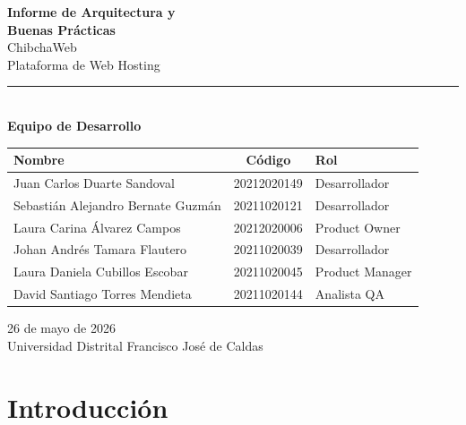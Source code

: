 \documentclass[12pt, a4paper]{article}
\begin{document}
\begin{titlepage}
    \centering
    \vspace*{2cm}

    {\Huge\bfseries\textcolor{chibchablue}{Informe de Arquitectura y\\[0.3em] Buenas Prácticas}}\\[1.5em]
    {\LARGE\textcolor{chibchagreen}{ChibchaWeb}}\\[0.5em]
    {\large Plataforma de Web Hosting}\\[3em]

    \rule{\textwidth}{1pt}\\[2em]

    {\large\textbf{Equipo de Desarrollo}}\\[1.5em]

    \begin{tabular}{l c l}
        \toprule
        \textbf{Nombre} & \textbf{Código} & \textbf{Rol} \\
        \midrule
        Juan Carlos Duarte Sandoval & 20212020149 & Desarrollador \\
        Sebastián Alejandro Bernate Guzmán & 20211020121 & Desarrollador \\
        Laura Carina Álvarez Campos & 20212020006 & Product Owner \\
        Johan Andrés Tamara Flautero & 20211020039 & Desarrollador \\
        Laura Daniela Cubillos Escobar & 20211020045 & Product Manager \\
        David Santiago Torres Mendieta & 20211020144 & Analista QA \\
        \bottomrule
    \end{tabular}

    \vfill

    {\large 26 de mayo de 2026}\\[1em]
    {\normalsize Universidad Distrital Francisco José de Caldas}

\end{titlepage}

\newpage
\tableofcontents
\newpage

\section{Introducción}
\end{document}
